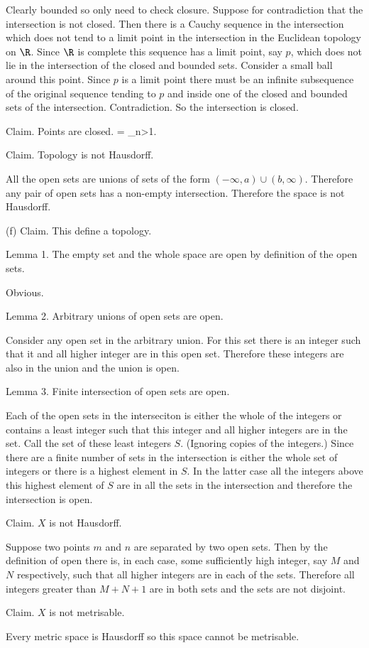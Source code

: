 \begin{solution}[\bf Solution.]
Clearly bounded so only need to check closure. Suppose for contradiction that the intersection is not closed. Then there is a Cauchy sequence in the intersection which does not tend to a limit point in the intersection in the Euclidean topology on $\R$. Since $\R$ is complete this sequence has a limit point, say $p$, which does not lie in the intersection of the closed and bounded sets. Consider a small ball around this point. Since $p$ is a limit point there must be an infinite subsequence of the original sequence tending to $p$ and inside one of the closed and bounded sets of the intersection. Contradiction. So the intersection is closed.

Claim. Points are closed.
\be
{} = \bigcap_{n>1}.
\ee

Claim. Topology is not Hausdorff.

All the open sets are unions of sets of the form $(-\infty,a)\cup (b,\infty)$. Therefore any pair of open sets has a non-empty intersection. Therefore the space is not Hausdorff.

\item [(f)] Claim. This define a topology.

Lemma 1. The empty set and the whole space are open by definition of the open sets.

Obvious.

Lemma 2. Arbitrary unions of open sets are open.

Consider any open set in the arbitrary union. For this set there is an integer such that it and all higher integer are in this open set. Therefore these integers are also in the union and the union is open.

Lemma 3. Finite intersection of open sets are open.

Each of the open sets in the interseciton is either the whole of the integers or contains a least integer such that this integer and all higher integers are in the set. Call the set of these least integers $S$. (Ignoring copies of the integers.) Since there are a finite number of sets in the intersection is either the whole set of integers or there is a highest element in $S$. In the latter case all the integers above this highest element of $S$ are in all the sets in the intersection and therefore the intersection is open.

Claim. $X$ is not Hausdorff.

Suppose two points $m$ and $n$ are separated by two open sets. Then by the definition of open there is, in each case, some sufficiently high integer, say $M$ and $N$ respectively, such that all higher integers are in each of the sets. Therefore all integers greater than $M+N+1$ are in both sets and the sets are not disjoint.

Claim. $X$ is not metrisable.

Every metric space is Hausdorff so this space cannot be metrisable.
\een
\end{solution}


